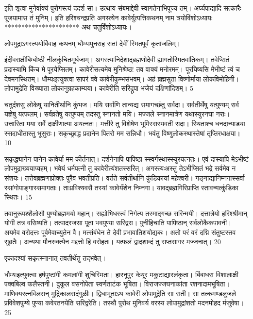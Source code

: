   इति शृत्वा मुनेर्वाक्यं पुरोगस्त्यं ददर्श सा।
 उत्थाय संबमाद्देवी स्वागतेनाभिपूज्य तम्।
 अर्घ्यपाद्यादि सत्कारैः पूजयामास तं मुनिम्।
 इति हरिश्चन्द्रप्रति अगस्त्येन कावेर्युत्पत्तिकथनम्
नाम त्रयोविंशोऽध्यायः
**********************
अथ चतुर्विंशोऽध्यायः।

लोपमुद्राऽगस्त्ययोर्विवाह कथनम् धौम्यःपुनराह सतां देवीं स्मितपूर्वं कृतांजलिम्।

इंदीवराक्षींबिम्बोष्ठी नीलकुंचितमूर्धजाम्।
 अगस्त्यःनिदेशाद्ब्रह्मणोदेवी ह्यागतोस्मितवांतिकम्।
 तवेप्सितं प्रदास्यामि किंच मे पूरयेप्सितम्।
 कावेरीसत्यमेव मुनिश्रेष्ठ! तव वाक्यं मनोरमम्।
 पूरयिष्यसि मेभीष्टं त्वं च देवमनस्थितम्।
 धौम्यःइत्युक्त्वा सापरं ववे कावेरीकुम्भसंभवम्।
 अहं ब्रह्मसुता विष्णोर्माया लोकविमोहिनी।
 लोपामुद्रेति विख्याता लोकानुग्रहकाम्यया।
 कावेरीति सरिद्रूपा भजेयं दक्षिणांदिशम्।
 5

  चतुर्दशसु लोकेषु यानितीर्थानि कुंभज।
 मयि सर्वाणि तान्यद्य समागच्छंतु सर्वदा।
 सर्वतीर्थेषु यत्पुण्यम् सर्व यज्ञेषु यत्फलम्।
 सर्वव्रतेषु यत्पुण्यम् तदस्तु स्नानतो मयि।
 मज्जले स्नानमात्रेण यथास्युरनघा नराः।
 उत्तारिता मया सर्वे दाक्षीणात्या अयत्नतः।
 मत्तीरे तु विशेषेण भूमिस्सस्यवती सदा।
 स्थिताश्च धनदान्याड्या स्सदाधीतास्तु भूसुराः।
 सकृच्छ्राद्ध प्रदानेन पितरो मम सन्निधौ।
 भवंतु विष्णुलोकस्थास्तेषां तृप्तिरधाक्षया।
 10

 
सकृद्ध्यानेन पानेन कावेर्या मम कीर्तनात्।
 दर्शनेनापि पापिष्ठा स्स्वर्गस्थास्स्युरयत्नतः।
 एवं दास्यापि मेऽभीष्टं लोपमुद्राख्ययाप्यहम्।
 भवेयं धर्मपत्नी तु कावेरीत्यंशतस्सरित्।
 अगस्त्यःअस्तु तेऽभीप्सितं भद्रे सर्वमेव न संशयः।
 तत्तेवब्रह्मणाप्रोक्तः पुरैव भवतींप्रति।
 वर्तते सर्वतीर्थानि कुंडिकायां महेश्वरी।
 गङ्गाद्यानिम्नगास्सर्वा स्सांगोपाङ्गास्समागताः।
 ताःप्रविश्यवसै तस्यां कावेर्यंशेन निम्नगा।
 यावद्ब्रह्मगिरिप्राप्ति स्तावन्मत्कुंडिका स्थितः।
 15

  तवानुरूपश्शैलोसौ पुण्योब्रह्ममयो महान्।
 सह्योभिधस्त्वं निर्गत्य तस्माद्गच्छ सरिन्मयी।
 दत्तात्रेयो हरिश्श्रीमान् योगी तत्र वसिष्यति।
 तत्पादरजसा पूता भवपुण्या सरिद्वरा।
 पुनीहिचाति पापिष्ठान् सर्वलोकैकपावनी।
 अयमेव वरोदत्तः पूर्वमेवाच्युतेन वै।
 मत्संबंधेन ते देवी प्रभावातिशयोद्यकः।
 अतो परं वरं दद्मि संतुष्टस्तव सुव्रतैः।
 अन्यथा पौनरुक्त्येन मद्दत्तो हि वरोहतः।
 यत्फलं द्वादशाब्दं तु सप्तसागर मज्जनात्।
 20

  एकादश्यां सकृत्स्नानात् तवतीर्थेतु तद्भवेत्।

धौम्यःइत्युक्त्वा हर्षपुष्टांगी कमलांगी शुचिस्मिता।
 हारनूपुर केयूर मकुटाद्यारलंकृता।
 बिंबाधरा विशालाक्षी पक्वबिल्व फलैस्तनी।
 दुकूल वसनोपेता स्वर्णताटंक भूषिता।
 विराजज्जघनाकांता रशनादामभूषिता।
 माणिक्यरत्नविलसन् मुद्रिकालसदंगुळीः।
 द्विधाभूताऽथ कावेरी लोपामुद्रेति सा सती।
 सा तत्कमण्डलुजले प्रविवेशपुण्ये
पुण्या कवेरतनयेति सरिद्वरेति।
 तस्थौ पुरोथ मुनिवर्य वरस्य
लोपामुद्रांशतो मदनमोहद मंजुवेषा।
 25

